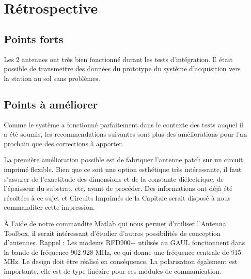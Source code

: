 \section{Rétrospective}

\subsection{Points forts}

Les 2 antennes ont très bien fonctionné durant les tests d'intégration. Il
était possible de transmettre des données du prototype du système d'acquisition
vers la station au sol sans problèmes.

\subsection{Points à améliorer}

Comme le système a fonctionné parfaitement dans le contexte des tests auquel il
a été soumis, les recommendations suivantes sont plus des améliorations pour
l'an prochain que des corrections à apporter.
\par
La première amélioration possible est de fabriquer l'antenne patch sur un
circuit imprimé flexible. Bien que ce soit une option esthétique très
intéressante, il faut s'assurer de l'exactitude des dimensions et de la
constante diélectrique, de l'épaisseur du substrat, etc, avant de procéder. Des
informations ont déjà été récoltées à ce sujet et Circuits Imprimés de la
Capitale serait disposé à nous commanditer cette impression.
\par
À l'aide de notre commandite Matlab qui nous permet d'utiliser l'Antenna
Toolbox, il serait intéressant d'étudier d'autres possibilités de conception
d'antennes. Rappel : Les modems RFD900+ utilisés au GAUL fonctionnent dans la
bande de fréquence 902-928 MHz, ce qui donne une fréquence centrale de 915 MHz.
Le design doit être réalisé en conséquence. La polarisation également est
importante, elle est de type linéaire pour ces modules de communication.
